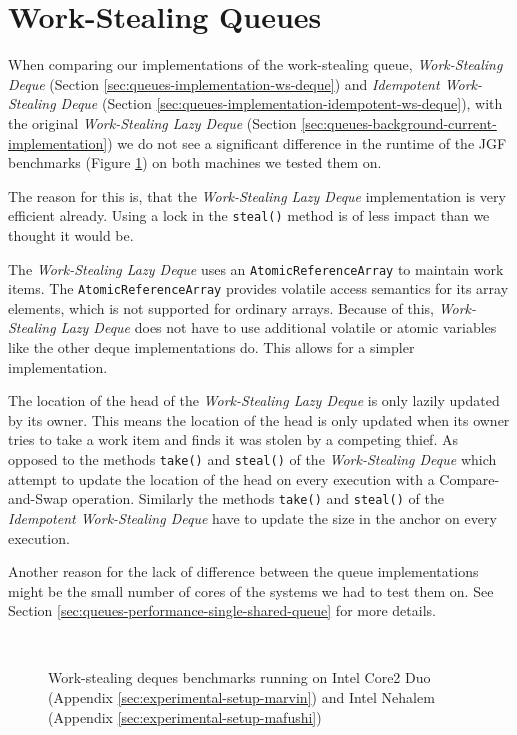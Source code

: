 \section{Work-Stealing Queues}
\label{sec:queues-performance-ws}

When comparing our implementations of the work-stealing queue,
\emph{Work-Stealing Deque} (Section
\ref{sec:queues-implementation-ws-deque}) and \emph{Idempotent
  Work-Stealing Deque} (Section
\ref{sec:queues-implementation-idempotent-ws-deque}), with the
original \emph{Work-Stealing Lazy Deque} (Section
\ref{sec:queues-background-current-implementation}) we do not see a
significant difference in the runtime of the JGF benchmarks (Figure
\ref{fig:queues-performance-deques}) on both machines we tested them
on.

The reason for this is, that the \emph{Work-Stealing Lazy Deque}
implementation is very efficient already. Using a lock in the
\lstinline!steal()! method is of less impact than we thought it would
be.

The \emph{Work-Stealing Lazy Deque} uses an
\lstinline!AtomicReferenceArray! to maintain work items. The
\lstinline!AtomicReferenceArray! provides volatile access semantics
for its array elements, which is not supported for ordinary
arrays. Because of this, \emph{Work-Stealing Lazy Deque} does not have
to use additional volatile or atomic variables like the other deque
implementations do. This allows for a simpler implementation.

The location of the head of the \emph{Work-Stealing Lazy Deque} is
only lazily updated by its owner. This means the location of the head
is only updated when its owner tries to take a work item and finds it
was stolen by a competing thief. As opposed to the methods
\lstinline!take()! and \lstinline!steal()!  of the \emph{Work-Stealing
  Deque} which attempt to update the location of the head on every
execution with a Compare-and-Swap operation. Similarly the methods
\lstinline!take()!  and \lstinline!steal()! of the \emph{Idempotent
  Work-Stealing Deque} have to update the size in the anchor on every
execution.

Another reason for the lack of difference between the queue
implementations might be the small number of cores of the systems we
had to test them on. See Section
\ref{sec:queues-performance-single-shared-queue} for more details.

\begin{figure}[!ht]
  \centering
  \\
  \caption[Work-stealing deques benchmark results]{Work-stealing
    deques benchmarks running on Intel Core2 Duo (Appendix
    \ref{sec:experimental-setup-marvin}) and Intel Nehalem (Appendix
    \ref{sec:experimental-setup-mafushi})}
  \label{fig:queues-performance-deques}
\end{figure}


